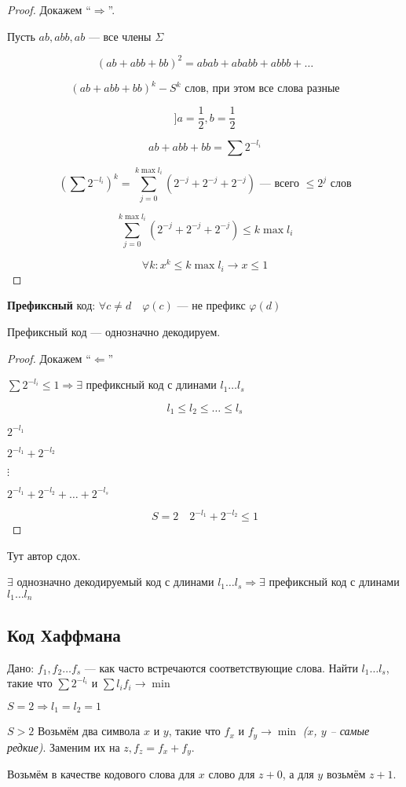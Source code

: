 \begin{proof}
    Докажем ``$\Rightarrow$''.

    Пусть $ab, abb, ab$ --- все члены $\Sigma$

    $$(ab+abb+bb)^2=abab+ababb+abbb+\ldots$$

    $$(ab+abb+bb)^k - S^k \text{ слов, при этом все слова разные} $$
    
    $$]a=\frac{1}{2}, b=\frac{1}{2}$$

    $$ab+abb+bb=\sum 2^{-l_i}$$

    $$(\sum 2^{-l_i})^k=\sum_{j=0}^{k\max l_i}(2^{-j}+2^{-j}+2^{-j}) \text{ --- всего $\leq 2^j$ слов}$$

    $$\sum_{j=0}^{k\max l_i}(2^{-j}+2^{-j}+2^{-j})\leq k\max l_i$$

    $$\forall k: x^k\leq k\max l_i \to x\leq 1$$
\end{proof}

\begin{definition}
    \textbf{Префиксный} код: $\forall c\not=d \quad \varphi(c)$ --- не префикс $\varphi(d)$
\end{definition}

\begin{lemma}
    Префиксный код --- однозначно декодируем.
\end{lemma}

\begin{proof}
    Докажем ``$\Leftarrow$''

    $\sum 2^{-l_i}\leq 1 \Rightarrow \exists$ префиксный код с длинами $l_1\ldots l_s$

    $$l_1\leq l_2\leq \ldots\leq l_s$$
    
    $2^{-l_1}$

    $2^{-l_1}+2^{-l_2}$

    $\vdots$

    $2^{-l_1}+2^{-l_2}+\ldots+2^{-l_s}$

    $$S=2 \quad 2^{-l_1}+2^{-l_2}\leq 1$$
\end{proof}

Тут автор сдох.

\begin{consequence}
    $\exists$ однозначно декодируемый код с длинами $l_1\ldots l_s \Rightarrow \exists$ префиксный код с длинами $l_1\ldots l_n$
\end{consequence}

\subsection{Код Хаффмана}

Дано: $f_1,f_2\ldots f_s$ --- как часто встречаются соответствующие слова. Найти $l_1\ldots l_s$, такие что $\sum 2^{-l_i}$ и $\sum l_if_i\to \min$

$S=2\Rightarrow l_1=l_2=1$

$S>2$ Возьмём два символа $x$ и $y$, такие что $f_x$ и $f_y\to\min$ \textit{($x$, $y$ -- самые редкие)}. Заменим их на $z, f_z=f_x+f_y$.

Возьмём в качестве кодового слова для $x$ слово для $z + 0$, а для $y$ возьмём $z + 1$.

